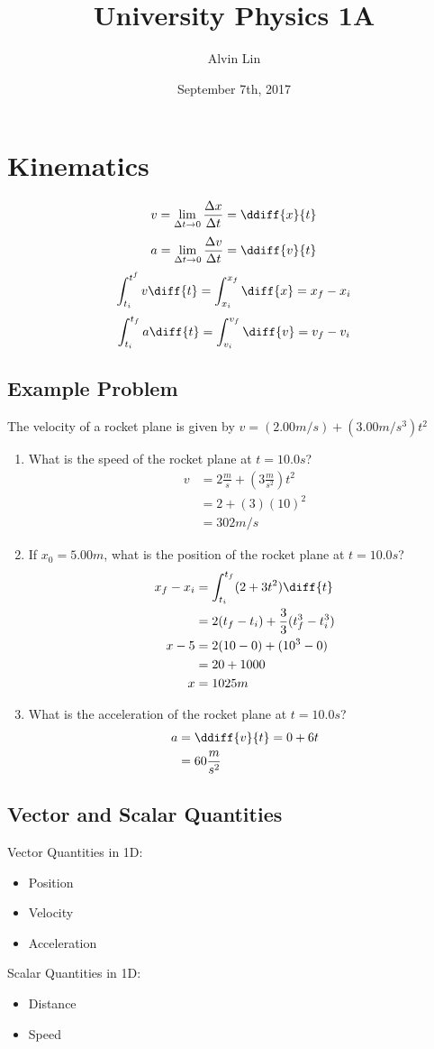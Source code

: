 \documentclass{math}
\title{University Physics 1A}
\author{Alvin Lin}
\date{September 7th, 2017}
\begin{document}
\maketitle

\section*{Kinematics}
\[ v = \lim_{\Delta t\to0}\frac{\Delta x}{\Delta t} = \ddiff{x}{t} \]
\[ a = \lim_{\Delta t\to0}\frac{\Delta v}{\Delta t} = \ddiff{v}{t} \]
\[ \int_{t_i}^{t^f}v\diff{t} = \int_{x_i}^{x_f}\diff{x} = x_f-x_i \]
\[ \int_{t_i}^{t_f}a\diff{t} = \int_{v_i}^{v_f}\diff{v} = v_f-v_i \]

\subsection*{Example Problem}
The velocity of a rocket plane is given by \( v = (2.00 m/s) + (3.00m/s^3)t^2 \)
\begin{enumerate}
  \item What is the speed of the rocket plane at \( t = 10.0s \)?
    \begin{align*}
      v &= 2\frac{m}{s}+(3\frac{m}{s^2})t^2 \\
      &= 2+(3)(10)^2 \\
      &= 302m/s
    \end{align*}
  \item If \( x_0 = 5.00m \), what is the position of the rocket plane at
    \( t = 10.0s \)?
    \begin{align*}
      x_f-x_i &= \int_{t_i}^{t_f}(2+3t^2)\diff{t} \\
      &= 2(t_f-t_i)+\frac{3}{3}(t_f^3-t_i^3) \\
      x-5 &= 2(10-0)+(10^3-0) \\
      &= 20+1000 \\
      x &= 1025m
    \end{align*}
  \item What is the acceleration of the rocket plane at \( t = 10.0s \)?
    \begin{align*}
      a &= \ddiff{v}{t} = 0+6t \\
      &= 60\frac{m}{s^2}
    \end{align*}
\end{enumerate}

\subsection*{Vector and Scalar Quantities}
Vector Quantities in 1D:
\begin{itemize}
  \item Position
  \item Velocity
  \item Acceleration
\end{itemize}
Scalar Quantities in 1D:
\begin{itemize}
  \item Distance
  \item Speed
\end{itemize}
\end{document}
